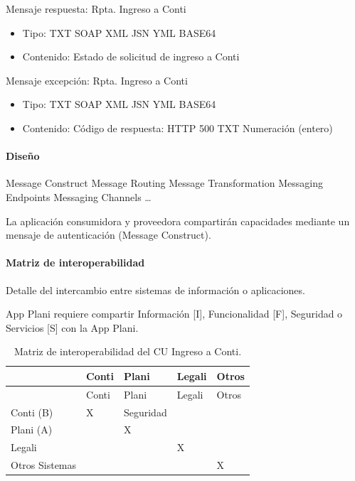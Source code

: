 \documentclass[
  paper=a4,
  ,captions=tableheading
]{scrartcl}
\providecommand{\tightlist}{%
  \setlength{\itemsep}{0pt}\setlength{\parskip}{0pt}}
\begin{document}
Mensaje respuesta: Rpta. Ingreso a Conti

\begin{itemize}
\tightlist
\item
  Tipo: TXT \textbar{} SOAP \textbar{} XML \textbar{} JSN \textbar{} YML
  \textbar{} BASE64
\item
  Contenido: Estado de solicitud de ingreso a Conti
\end{itemize}

Mensaje excepción: Rpta. Ingreso a Conti

\begin{itemize}
\tightlist
\item
  Tipo: TXT \textbar{} SOAP \textbar{} XML \textbar{} JSN \textbar{} YML
  \textbar{} BASE64
\item
  Contenido: Código de respuesta: HTTP 500 \textbar{} TXT \textbar{}
  Numeración (entero)
\end{itemize}

\paragraph{Diseño}\label{sec:diseuxf1o-2}

Message Construct \textbar{} Message Routing \textbar{} Message
Transformation \textbar{} Messaging Endpoints \textbar{} Messaging
Channels \textbar{} \ldots{}

La aplicación consumidora y proveedora compartirán capacidades mediante
un mensaje de autenticación (Message Construct).

\paragraph{Matriz de
interoperabilidad}\label{sec:matriz-de-interoperabilidad-2}

Detalle del intercambio entre sistemas de información o aplicaciones.

App Plani requiere compartir Información {[}I{]}, Funcionalidad {[}F{]},
Seguridad o Servicios {[}S{]} con la App Plani.

\begin{longtable}[]{@{}lllll@{}}
\caption{Matriz de interoperabilidad del CU Ingreso a
Conti.}\tabularnewline
\toprule\noalign{}
& Conti & Plani & Legali & Otros \\
\midrule\noalign{}
\endfirsthead
\toprule\noalign{}
& Conti & Plani & Legali & Otros \\
\midrule\noalign{}
\endhead
\bottomrule\noalign{}
\endlastfoot
Conti (B) & X & Seguridad & & \\
Plani (A) & & X & & \\
Legali & & & X & \\
Otros Sistemas & & & & X \\
\end{longtable}
\end{document}
